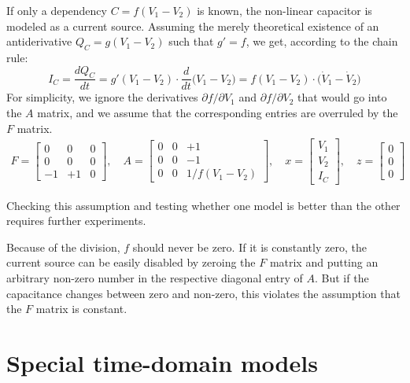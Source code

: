 If only a dependency $C=f(V_1-V_2)$ is known, the non-linear capacitor
is modeled as a current source.  Assuming the merely theoretical
existence of an antiderivative $Q_C=g(V_1-V_2)$ such that $g'=f$, we
get, according to the chain rule:
\begin{equation}
I_C=\frac{dQ_C}{dt}=g'(V_1-V_2)\cdot \frac{d}{dt}\bigl(V_1-V_2)
=f(V_1-V_2)\cdot \bigl(\dot{V}_1-\dot{V}_2\bigr)
\end{equation}
For simplicity, we ignore the derivatives $\partial f/\partial V_1$
and $\partial f/\partial V_2$ that would go into the $A$ matrix, and
we assume that the corresponding entries are overruled by the $F$
matrix.
\begin{equation}
\begin{gathered}
F=
\begin{bmatrix}
0 & 0 & 0\\
0 & 0 & 0\\
-1 & +1 & 0
\end{bmatrix},\quad
A=
\begin{bmatrix}
0 & 0 & +1\\
0 & 0 & -1\\
0 & 0 & 1/f(V_1-V_2)
\end{bmatrix},\quad
x=
\begin{bmatrix}
V_1\\
V_2\\
I_C
\end{bmatrix},\quad
z=
\begin{bmatrix}
0\\
0\\
0
\end{bmatrix}
\end{gathered}
\end{equation}

Checking this assumption and testing whether one model is better than
the other requires further experiments.

Because of the division, $f$ should never be zero.  If it is
constantly zero, the current source can be easily disabled by zeroing
the $F$ matrix and putting an arbitrary non-zero number in the
respective diagonal entry of $A$.  But if the capacitance changes
between zero and non-zero, this violates the assumption that the $F$
matrix is constant.

\section{Special time-domain models}

